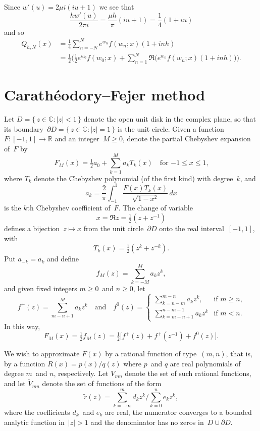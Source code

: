 \documentclass[12pt,a4paper]{article}
\begin{document}
Since $w'(u)=2\mu i(iu+1)$ we see that
\[
\frac{hw'(u)}{2\pi i}=\frac{\mu h}{\pi}(iu+1)=\frac{1}{4}(1+iu)
\]
and so
\begin{align*}
Q_{h,N}(x)&=\frac{1}{4}\sum_{n=-N}^Ne^{w_n}f(w_n;x)(1+inh)\\
    &=\frac{1}{2}\biggl(\tfrac12e^{w_0}f(w_0;x)+\sum_{n=1}^N\Re\bigl(
    e^{w_n}f(w_n;x)(1+inh)\bigr)\biggr).
\end{align*}

\section{Carath\'eodory--Fejer method}
Let $D=\{\,z\in\mathbb{C}:|z|<1\,\}$ denote the open unit disk in the complex 
plane, so that its boundary~$\partial D=\{\,z\in\mathbb{C}:|z|=1\,\}$ is the 
unit circle.  Given a function~$F:[-1,1]\to\mathbb{R}$ and an integer~$M\ge0$, 
denote the partial Chebyshev expansion of~$F$ by
\[
F_M(x)=\tfrac12 a_0+\sum_{k=1}^Ma_kT_k(x)\quad\text{for $-1\le x\le 1$,}
\]
where $T_k$ denote the Chebyshev polynomial (of the first kind) with degree~$k$,
and
\[
a_k=\frac{2}{\pi}\int_{-1}^1\frac{F(x)T_k(x)}{\sqrt{1-x^2}}\,dx
\]
is the $k$th Chebyshev coefficient of~$F$.  The change of variable
\[
x=\Re z=\tfrac12(z+z^{-1})
\]
defines a bijection~$z\mapsto x$ from the unit circle~$\partial D$ onto the 
real interval~$[-1,1]$, with
\[
T_k(x)=\tfrac12(z^k+z^{-k}).
\]
Put $a_{-k}=a_k$ and define
\[
f_M(z)=\sum_{k=-M}^M a_kz^k,
\]
and given fixed integers $m\ge 0$~and $n\ge0$, let
\[
f^+(z)=\sum_{m-n+1}^M a_kz^k\quad\text{and}\quad
f^0(z)=\begin{cases}
    \sum_{k=n-m}^{m-n}a_kz^k,&\text{if $m\ge n$,}\\
    \sum_{k=m-n+1}^{n-m-1}a_kz^k&\text{if $m<n$.}
       \end{cases}
\]
In this way,
\begin{equation}\label{eq: FM}
F_M(x)=\tfrac12f_M(z)=\tfrac12\bigl[f^+(z)+f^+(z^{-1}) +f^0(z)\bigr].
\end{equation}

We wish to approximate $F(x)$ by a rational function of type~$(m,n)$, that is,
by a function $R(x)=p(x)/q(z)$ where $p$~and $q$ are real polynomials of degree 
$m$~and $n$, respectively.  Let $V_{mn}$ denote the set of such rational 
functions, and let $\tilde V_{mn}$ denote the set of functions of the form
\[
\tilde r(z)=\sum_{k=-\infty}^m d_kz^k\bigg/\sum_{k=0}^n e_kz^k,
\]
where the coefficients $d_k$~and $e_k$ are real, the numerator converges to 
a bounded analytic function in~$|z|>1$ and the denominator has no zeros 
in~$D\cup\partial D$.
\end{document}
